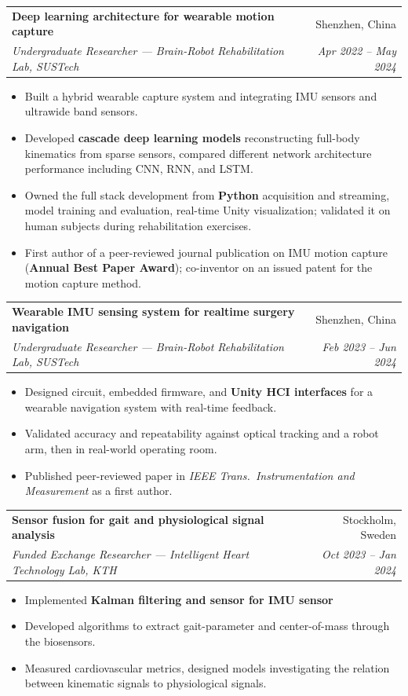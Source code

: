 \documentclass[letterpaper,10pt]{article}
\makeatletter
\newcommand{\resumeItem}[1]{
  \item\small{{#1 \vspace{-2.5pt}}}
}
\newcommand{\resumeItemStar}[1]{
  \item[$\star$]\small{{#1 \vspace{-2.5pt}}}
}
\newcommand{\resumeSubheading}[4]{
  \vspace{-1pt}\item
  \begin{tabular*}{0.98\textwidth}[t]{l@{\extracolsep{\fill}}r}
    \textbf{#1} & \small#2 \\
    \textit{\small#3} & \textit{\small #4} \\
  \end{tabular*}\vspace{-6pt}
}
\newcommand{\resumeItemListStart}{\begin{itemize}[leftmargin=0.28in, topsep=1pt, itemsep=0pt, parsep=0pt]}
\newcommand{\resumeItemListEnd}{\end{itemize}\vspace{-4pt}}
\makeatother
\begin{document}
\resumeSubheading
{Deep learning architecture for wearable motion capture}{Shenzhen, China}
{Undergraduate Researcher --- Brain-Robot Rehabilitation Lab, SUSTech}{Apr 2022 -- May 2024}
\resumeItemListStart
\vspace{2pt}
\resumeItem{Built a hybrid wearable capture system and integrating IMU sensors and ultrawide band sensors.}
\vspace{2pt}
\resumeItem{Developed \textbf{cascade deep learning
models} reconstructing full-body kinematics from sparse sensors, compared different network architecture performance including CNN, RNN, and LSTM.}
\vspace{2pt}
\resumeItem{Owned the full stack development from \textbf{Python} acquisition and streaming, model training and evaluation,
real-time Unity visualization; validated it on human subjects during rehabilitation exercises.}
\vspace{2pt}
\resumeItemStar{First author of a peer-reviewed journal publication on IMU motion capture (\textbf{Annual Best Paper Award});
co-inventor on an issued patent for the motion capture method.}
\resumeItemListEnd

\resumeSubheading
{Wearable IMU sensing system for realtime surgery navigation}{Shenzhen, China}
{Undergraduate Researcher --- Brain-Robot Rehabilitation Lab, SUSTech}{Feb 2023 -- Jun 2024}
\resumeItemListStart
\vspace{2pt}
\resumeItem{Designed circuit, embedded firmware, and \textbf{Unity HCI interfaces} for a wearable navigation
system with real-time feedback.}
\vspace{2pt}
\resumeItem{Validated accuracy and repeatability against optical tracking and a robot arm, then in real-world operating room.}
\vspace{2pt}
\resumeItemStar{Published peer-reviewed paper in \textit{IEEE Trans.\ Instrumentation and Measurement} as a first author.}
\resumeItemListEnd

\resumeSubheading
{Sensor fusion for gait and physiological signal analysis}{Stockholm, Sweden}
{Funded Exchange Researcher --- Intelligent Heart Technology Lab, KTH}{Oct 2023 -- Jan 2024}
\resumeItemListStart
\vspace{2pt}
\resumeItem{Implemented \textbf{Kalman filtering and sensor for IMU sensor}}
\vspace{2pt}
\resumeItem{Developed algorithms to extract gait-parameter and center-of-mass through the biosensors.}
\vspace{2pt}
\resumeItem{Measured cardiovascular metrics, designed models investigating the relation between kinematic
signals to physiological signals.}
\resumeItemListEnd
\end{document}
